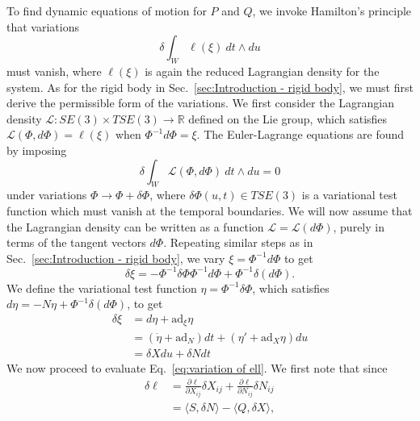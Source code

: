 To find dynamic equations of motion for $P$ and $Q$, we invoke Hamilton's principle that variations
\begin{equation} \label{eq:variation of ell}
\delta \int_W \ell(\xi)\ dt \wedge du
\end{equation}
must vanish, where $\ell(\xi)$ is again the reduced Lagrangian density for the system. As for the rigid body in Sec.~\ref{sec:Introduction - rigid body}, we must first derive the permissible form of the variations. We first consider the Lagrangian density $\mathcal{L} : SE(3) \times TSE(3) \to \mathbb{R}$ defined on the Lie group, which satisfies $\mathcal{L}(\Phi, d \Phi) = \ell(\xi)$ when $\Phi^{-1} d \Phi = \xi$. The Euler-Lagrange equations are found by imposing
\begin{equation} \label{eq:hamiltons principle}
\delta \int_W \mathcal{L}(\Phi, d \Phi)\ dt \wedge du = 0
\end{equation}
under variations $\Phi \to \Phi + \delta \Phi$, where $\delta \Phi(u,t) \in TSE(3)$ is a variational test function which must vanish at the temporal boundaries. We will now assume that the Lagrangian density can be written as a function $\mathcal{L} = \mathcal{L}(d \Phi)$, purely in terms of the tangent vectors $d \Phi$. Repeating similar steps as in Sec.~\ref{sec:Introduction - rigid body}, we vary $\xi = \Phi^{-1} d \Phi$ to get
\begin{equation}
\delta \xi = - \Phi^{-1} \delta \Phi \Phi^{-1} d \Phi + \Phi^{-1} \delta (d \Phi).
\end{equation}
We define the variational test function $\eta = \Phi^{-1} \delta \Phi$, which satisfies $d \eta = - N \eta + \Phi^{-1} \delta (d \Phi)$, to get
\begin{equation}
\begin{aligned}
\delta \xi & = d \eta + \text{ad}_\xi \eta \\
& = (\dot{\eta} + \text{ad}_N ) dt + (\eta' + \text{ad}_X \eta) du \\
& = \delta X du + \delta N dt
\end{aligned}
\end{equation}
We now proceed to evaluate Eq.~\ref{eq:variation of ell}. We first note that since
\begin{equation}
\begin{aligned}
\delta \ell & = \frac{\partial \ell}{\partial X_{ij}} \delta X_{ij} + \frac{\partial \ell}{\partial N_{ij}} \delta N_{ij} \\ 
& = \langle S, \delta N \rangle  - \langle Q, \delta X \rangle,
\end{aligned} 
\end{equation}

